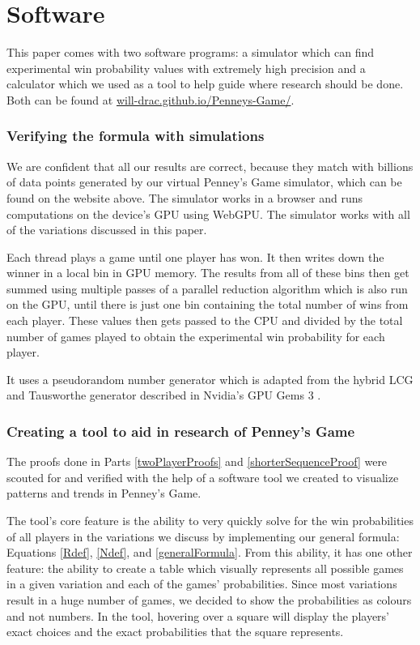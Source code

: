 \documentclass[english,12pt,a4paper,final]{article}
\begin{document}
\part {Software}

This paper comes with two software programs: a simulator which can find experimental win probability values with extremely high precision and a calculator which we used as a tool to help guide where research should be done. Both can be found at \href{https://will-drac.github.io/Penneys-Game/}{will-drac.github.io/Penneys-Game/}.

\section{Verifying the formula with simulations}

We are confident that all our results are correct, because they match with billions of data points generated by our virtual Penney's Game simulator, which can be found on the website above. The simulator works in a browser and runs computations on the device's GPU using WebGPU. The simulator works with all of the variations discussed in this paper.

Each thread plays a game until one player has won. It then writes down the winner in a local bin in GPU memory. The results from all of these bins then get summed using multiple passes of a parallel reduction algorithm which is also run on the GPU, until there is just one bin containing the total number of wins from each player. These values then gets passed to the CPU and divided by the total number of games played to obtain the experimental win probability for each player.

It uses a pseudorandom number generator which is adapted from the hybrid LCG and Tausworthe generator described in Nvidia's GPU Gems 3 \parencite{prng}.

\section {Creating a tool to aid in research of Penney's Game}

The proofs done in Parts \ref{twoPlayerProofs} and \ref{shorterSequenceProof} were scouted for and verified with the help of a software tool we created to visualize patterns and trends in Penney's Game.

The tool's core feature is the ability to very quickly solve for the win probabilities of all players in the variations we discuss by implementing our general formula: Equations \eqref{Rdef}, \eqref{Ndef}, and \eqref{generalFormula}. From this ability, it has one other feature: the ability to create a table which visually represents all possible games in a given variation and each of the games' probabilities. Since most variations result in a huge number of games, we decided to show the probabilities as colours and not numbers. In the tool, hovering over a square will display the players' exact choices and the exact probabilities that the square represents.
\end{document}
